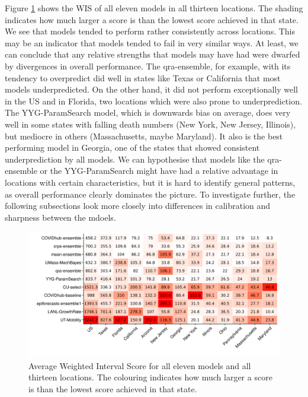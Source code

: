 \documentclass[
]{book}
\begin{document}
Figure \ref{fig:heatmap-performance-states} shows the WIS of all eleven models in all thirteen locations. The shading indicates how much larger a score is than the lowest score achieved in that state. We see that models tended to perform rather consistently across locations. This may be an indicator that models tended to fail in very similar ways. At least, we can conclude that any relative strengths that models may have had were dwarfed by divergences in overall performance. The qra-ensemble, for example, with its tendency to overpredict did well in states like Texas or California that most models underpredicted. On the other hand, it did not perform exceptionally well in the US and in Florida, two locations which were also prone to underprediction. The YYG-ParamSearch model, which is downwards bias on average, does very well in some states with falling death numbers (New York, New Jersey, Illinois), but mediocre in others (Massachusetts, maybe Maryland). It also is the best performing model in Georgia, one of the states that showed consistent underprediction by all models. We can hypothesise that models like the qra-ensemble or the YYG-ParamSearch might have had a relative advantage in locations with certain characteristics, but it is hard to identify general patterns, as overall performance clearly dominates the picture. To investigate further, the following subsections look more closely into differences in calibration and sharpness between the mdoels.

\begin{figure}
\includegraphics[width=1\linewidth]{../visualisation/chapter-5-results/scenario-baseline/heatmap-model-scores} \caption{Average Weighted Interval Score for all eleven models and all thirteen locations. The colouring indicates how much larger a score is than the lowest score achieved in that state.}\label{fig:heatmap-performance-states}
\end{figure}
\end{document}
